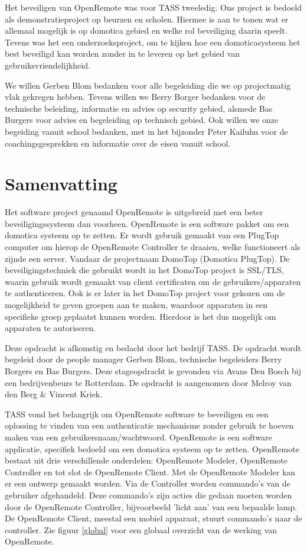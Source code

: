 \documentclass[]{article}
\begin{document}
Het beveiligen van OpenRemote was voor TASS tweeledig. Ons project is bedoeld als
demonstratieproject op beurzen en scholen. Hiermee is aan te tonen wat er
allemaal mogelijk is op domotica gebied en welke rol beveiliging daarin speelt.
Tevens was het een onderzoeksproject, om te kijken hoe een domoticasysteem
het best beveiligd kan worden zonder in te leveren op het gebied van
gebruiksvriendelijkheid.

We willen Gerben Blom bedanken voor alle begeleiding die we op projectmatig vlak
gekregen hebben. Tevens willen we Berry Borger bedanken voor de technische
beleiding, informatie en advies op security gebied, alsmede Bas Burgers voor advies en begeleiding op technisch gebied. Ook willen we onze
begeiding vanuit school bedanken, met in het bijzonder Peter Kailuhu voor
de coachingsgesprekken en informatie over de eisen vanuit school.

\newpage
\thispagestyle{empty}
\tableofcontents
\thispagestyle{empty}
\newpage
\thispagestyle{empty}
\listoftables
\listoffigures

\newpage
\section*{Samenvatting}
Het software project genaamd OpenRemote is uitgebreid met een beter
beveiligingssysteem dan voorheen. OpenRemote is een software
pakket om een domotica systeem op te zetten. Er wordt gebruik gemaakt van
een PlugTop computer om hierop de OpenRemote Controller te draaien, welke functioneert als
zijnde een server. Vandaar de projectnaam DomoTop (Domotica PlugTop).
De beveiligingstechniek die gebruikt wordt in het DomoTop project is SSL/TLS,
waarin gebruik wordt gemaakt van client certificaten om de
gebruikers/apparaten te authenticeren. Ook is er later in het DomoTop project
voor gekozen om de mogelijkheid te geven groepen aan te maken, waardoor
apparaten in een specifieke groep geplaatst kunnen worden. Hierdoor
is het dus mogelijk om apparaten te autoriseren.

Deze opdracht is afkomstig en bedacht door het bedrijf TASS. De opdracht wordt
begeleid door de people manager Gerben Blom, technische begeleiders Berry
Borgers en Bas Burgers. Deze stageopdracht is gevonden via Avans Den
Bosch bij een bedrijvenbeurs te Rotterdam. De opdracht is aangenomen door
Melroy van den Berg \& Vincent Kriek.

TASS vond het belangrijk om OpenRemote software te beveiligen en een oplossing
te vinden van een authenticatie mechanisme zonder gebruik te hoeven maken van
een gebruikersnaam/wachtwoord. OpenRemote is een software
applicatie, specifiek bedoeld om een domotica systeem op te zetten. OpenRemote
bestaat uit drie verschillende onderdelen: OpenRemote Modeler, OpenRemote
Controller en tot slot de OpenRemote Client. Met de OpenRemote Modeler kan er een ontwerp
gemaakt worden. Via de Controller worden commando's van de gebruiker
afgehandeld. Deze commando's zijn acties die gedaan moeten worden door de
OpenRemote Controller, bijvoorbeeld 'licht aan' van een bepaalde lamp. De OpenRemote Client, meestal een mobiel apparaat, stuurt
commando's naar de controller. Zie figuur \ref{global} voor een globaal overzicht van de
werking van OpenRemote.
\end{document}
